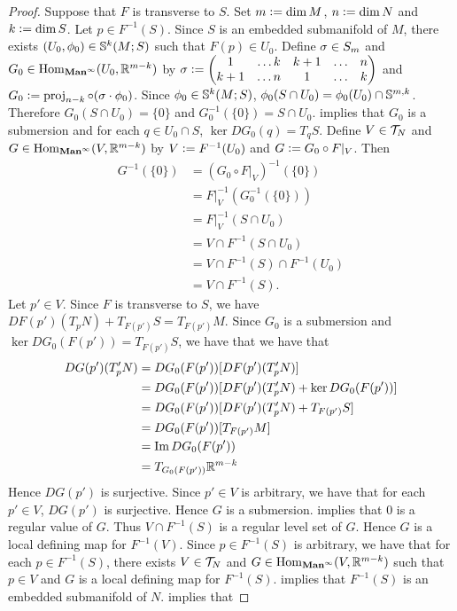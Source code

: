 \documentclass{book}
\begin{document}
	\begin{proof}
		Suppose that $F$ is transverse to $S$. Set $m \defeq \dim M$, $n \defeq \dim N$ and $k \defeq \dim S$. Let $p \in F^{-1}(S)$. Since $S$ is an embedded submanifold of $M$, there exists $(U_0, \phi_0) \in \S^k(M;S)$ such that $F(p) \in U_0$. Define $\sig \in S_m$ and $G_0 \in \Hom_{\Maninf}(U_0, \R^{m-k})$ by $\sig \defeq 
		\begin{pmatrix}
			1   & \ldots k & k+1 &  \ldots &  n \\
			k+1 & \ldots n & 1   &  \ldots &  k
		\end{pmatrix}$ 
		and $G_0 \defeq  \prj_{n-k} \circ (\sig \cdot \phi_0)$. Since $\phi_0 \in \S^k(M;S)$, $\phi_0(S \cap U_0) = \phi_0(U_0) \cap \S^{m,k}$. Therefore $G_0(S \cap U_0) = \{0\}$ and $G_0^{-1}(\{0\}) = S \cap U_0$.  implies that $G_0$ is a submersion and for each $q \in U_0 \cap S$, $\ker DG_0(q) = T_qS$. Define $V \in \MT_N$ and $G \in \Hom_{\Maninf}(V, \R^{m-k})$ by $V \defeq F^{-1}(U_0)$ and $G \defeq G_0 \circ F|_{V}$. Then 
		\begin{align*}
			G^{-1}(\{0\})
			& = (G_0 \circ F|_{V})^{-1}(\{0\}) \\
			& = F|_{V}^{-1} (G_0^{-1}(\{0\})) \\
			& = F|_{V}^{-1}(S \cap U_0) \\
			& = V \cap F^{-1}(S \cap U_0) \\
			& = V \cap F^{-1}(S) \cap F^{-1}(U_0) \\
			& = V \cap F^{-1}(S). 
		\end{align*}
		Let $p' \in V$. Since $F$ is transverse to $S$, we have $DF(p')(T_pN) + T_{F(p')}S = T_{F(p')}M$. Since $G_0$ is a submersion and $\ker DG_0(F(p')) = T_{F(p')}S$, we have that we have that 
		\begin{align*}
			DG(p')(T_p'N)
			& = DG_0(F(p')) [ DF(p') (T_p' N)] \\
			& = DG_0(F(p')) [ DF(p')(T_p'N) + \ker DG_0(F(p')) ] \\
			& = DG_0(F(p')) [ DF(p')(T_p'N) + T_{F(p')}S ] \\
			& = DG_0(F(p')) [ T_{F(p')} M ] \\
			& = \Im DG_0(F(p')) \\
			& = T_{G_0(F(p'))} \R^{m-k} 
		\end{align*}  
		Hence $DG(p')$ is surjective. Since $p' \in V$ is arbitrary, we have that for each $p' \in V$, $DG(p')$ is surjective. Hence $G$ is a submersion. \rex{}  implies that $0$ is a regular value of $G$. Thus $V \cap F^{-1}(S)$ is a regular level set of $G$. Hence $G$ is a local defining map for $F^{-1}(V)$. Since $p \in F^{-1}(S)$ is arbitrary, we have that for each $p \in F^{-1}(S)$, there exists $V \in \MT_N$ and $G \in \Hom_{\Maninf}(V, \R^{m-k})$ such that $p \in V$ and $G$ is a local defining map for $F^{-1}(S)$.   implies that $F^{-1}(S)$ is an embedded submanifold of $N$. \rex{}  implies that 

\end{proof}
\end{document}
